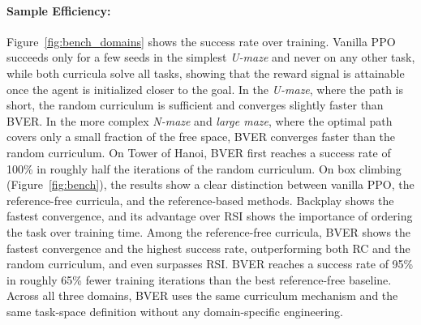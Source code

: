 \paragraph{Sample Efficiency:}
Figure~\ref{fig:bench_domains} shows the success rate over training. Vanilla PPO succeeds only for a few seeds in the simplest \textit{U-maze} and never on any other task, while both curricula solve all tasks, showing that the reward signal is attainable once the agent is initialized closer to the goal. In the \textit{U-maze}, where the path is short, the random curriculum is sufficient and converges slightly faster than BVER. In the more complex \textit{N-maze} and \textit{large maze}, where the optimal path covers only a small fraction of the free space, BVER converges faster than the random curriculum. On Tower of Hanoi, BVER first reaches a success rate of 100\% in roughly half the iterations of the random curriculum. On box climbing (Figure~\ref{fig:bench}), the results show a clear distinction between vanilla PPO, the reference-free curricula, and the reference-based methods. Backplay shows the fastest convergence, and its advantage over RSI shows the importance of ordering the task over training time. Among the reference-free curricula, BVER shows the fastest convergence and the highest success rate, outperforming both RC and the random curriculum, and even surpasses RSI. BVER reaches a success rate of 95\% in roughly 65\% fewer training iterations than the best reference-free baseline. Across all three domains, BVER uses the same curriculum mechanism and the same task-space definition without any domain-specific engineering.

